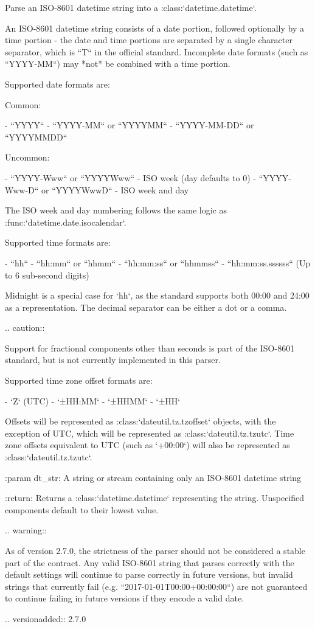 \begin{DoxyVerb}Parse an ISO-8601 datetime string into a :class:`datetime.datetime`.

An ISO-8601 datetime string consists of a date portion, followed
optionally by a time portion - the date and time portions are separated
by a single character separator, which is ``T`` in the official
standard. Incomplete date formats (such as ``YYYY-MM``) may *not* be
combined with a time portion.

Supported date formats are:

Common:

- ``YYYY``
- ``YYYY-MM`` or ``YYYYMM``
- ``YYYY-MM-DD`` or ``YYYYMMDD``

Uncommon:

- ``YYYY-Www`` or ``YYYYWww`` - ISO week (day defaults to 0)
- ``YYYY-Www-D`` or ``YYYYWwwD`` - ISO week and day

The ISO week and day numbering follows the same logic as
:func:`datetime.date.isocalendar`.

Supported time formats are:

- ``hh``
- ``hh:mm`` or ``hhmm``
- ``hh:mm:ss`` or ``hhmmss``
- ``hh:mm:ss.ssssss`` (Up to 6 sub-second digits)

Midnight is a special case for `hh`, as the standard supports both
00:00 and 24:00 as a representation. The decimal separator can be
either a dot or a comma.


.. caution::

    Support for fractional components other than seconds is part of the
    ISO-8601 standard, but is not currently implemented in this parser.

Supported time zone offset formats are:

- `Z` (UTC)
- `±HH:MM`
- `±HHMM`
- `±HH`

Offsets will be represented as :class:`dateutil.tz.tzoffset` objects,
with the exception of UTC, which will be represented as
:class:`dateutil.tz.tzutc`. Time zone offsets equivalent to UTC (such
as `+00:00`) will also be represented as :class:`dateutil.tz.tzutc`.

:param dt_str:
    A string or stream containing only an ISO-8601 datetime string

:return:
    Returns a :class:`datetime.datetime` representing the string.
    Unspecified components default to their lowest value.

.. warning::

    As of version 2.7.0, the strictness of the parser should not be
    considered a stable part of the contract. Any valid ISO-8601 string
    that parses correctly with the default settings will continue to
    parse correctly in future versions, but invalid strings that
    currently fail (e.g. ``2017-01-01T00:00+00:00:00``) are not
    guaranteed to continue failing in future versions if they encode
    a valid date.

.. versionadded:: 2.7.0
\end{DoxyVerb}
